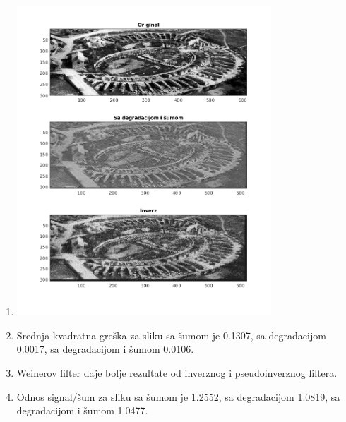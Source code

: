 \documentclass[12pt, a4]{report}
\begin{document}
\begin{enumerate}
\begin{minipage}{\linewidth}
	      \end{minipage}
	\item
	      \begin{minipage}{\linewidth}
		      \centering
		      \includegraphics[width=0.75\textwidth]{weinernpsf}
	      \end{minipage}
	\item
	      Srednja kvadratna greška za sliku sa šumom je 0.1307, sa degradacijom 0.0017, sa degradacijom i šumom 0.0106.
	\item
	      Weinerov filter daje bolje rezultate od inverznog i pseudoinverznog filtera.
	\item
	      Odnos signal/šum za sliku sa šumom je 1.2552, sa degradacijom 1.0819, sa degradacijom i šumom 1.0477.
\end{enumerate}
\end{document}
